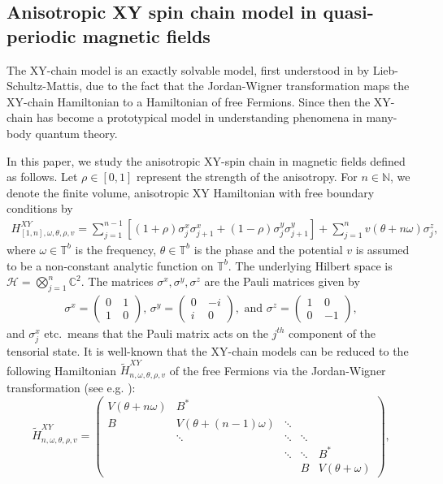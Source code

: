 \documentclass[11pt]{amsart}
\newcommand{\C}{\mathbb C}
\newcommand{\T}{\mathbb T}
\newcommand{\N}{\mathbb N}
\def\calH{\mathcal{H}}
\begin{document}
\subsection{Anisotropic XY spin chain model in quasi-periodic magnetic fields}\label{sec:spin}
The XY-chain model is an exactly solvable model, first understood in \cite{LSM} by Lieb-Schultz-Mattis, due to the fact that the Jordan-Wigner transformation maps the XY-chain Hamiltonian to a Hamiltonian of free Fermions. 
Since then the XY-chain has become a prototypical model in understanding phenomena in many-body quantum
theory.

In this paper, we study the anisotropic XY-spin chain in magnetic fields defined as follows.
Let $\rho\in [0,1]$ represent the strength of the anisotropy. 
For $n\in \N$, we denote the finite volume, anisotropic XY Hamiltonian with free boundary conditions by
\begin{align*}
H_{[1,n],\omega,\theta,\rho,v}^{XY}=\sum_{j=1}^{n-1} [(1+\rho)\sigma_j^x\sigma_{j+1}^x+(1-\rho)\sigma_j^y\sigma_{j+1}^{y}]+\sum_{j=1}^n v(\theta+n\omega) \sigma_j^z,
\end{align*}
where $\omega\in \T^b$ is the frequency, $\theta\in \T^b$ is the phase and the potential $v$ is assumed to be a non-constant analytic function on $\T^b$. The underlying Hilbert space is $\calH=\bigotimes_{j=1}^n\C^2$. 
The matrices $\sigma^x, \sigma^y, \sigma^z$ are the Pauli matrices given by 
\begin{align*}
\sigma^x=\left(\begin{matrix}
0 \ &1\\
1 &0
\end{matrix}\right),\,
\sigma^y=\left(\begin{matrix}
0 \ &-i\\
i &0
\end{matrix}\right),
\text{ and }
\sigma^z=\left(\begin{matrix}
1 \ &0\\
0 &-1
\end{matrix}\right),
\end{align*}
and $\sigma_j^x$ etc.\ means that the Pauli matrix acts on the $j^{th}$ component of the tensorial state. 
It is well-known that the XY-chain models can be reduced to the following Hamiltonian $\widetilde{H}^{XY}_{n,\omega,\theta,\rho,v}$ of the free Fermions via the Jordan-Wigner transformation (see e.g. \cite{HSS}):
\begin{equation}\label{def:tH_XY}
\widetilde{H}^{XY}_{n,\omega,\theta,\rho,v}=\left( \begin{array}{ccccc} V(\theta+n\omega) & B^* & & & \\ B & V(\theta+(n-1)\omega) & \ddots & & \\ & \ddots & \ddots & \ddots & \\ & & \ddots & \ddots & B^*\\ & & & B & V(\theta+\omega) \end{array} \right),
\end{equation}
\end{document}
